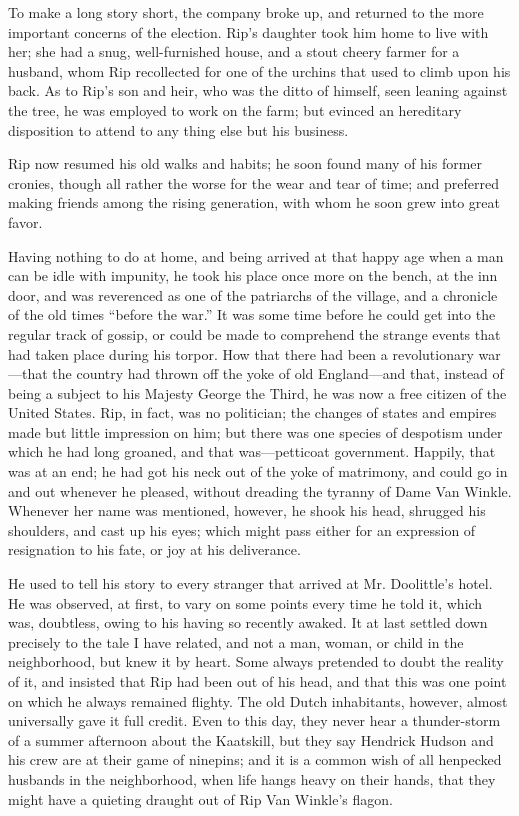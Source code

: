 To make a long story short, the company broke up, and returned to the more important concerns of the election. Rip’s daughter took him home to live with her; she had a snug, well-furnished house, and a stout cheery farmer for a husband, whom Rip recollected for one of the urchins that used to climb upon his back. As to Rip’s son and heir, who was the ditto of himself, seen leaning against the tree, he was employed to work on the farm; but evinced an hereditary disposition to attend to any thing else but his business.

Rip now resumed his old walks and habits; he soon found many of his former cronies, though all rather the worse for the wear and tear of time; and preferred making friends among the rising generation, with whom he soon grew into great favor.

Having nothing to do at home, and being arrived at that happy age when a man can be idle with impunity, he took his place once more on the bench, at the inn door, and was reverenced as one of the patriarchs of the village, and a chronicle of the old times “before the war.” It was some time before he could get into the regular track of gossip, or could be made to comprehend the strange events that had taken place during his torpor. How that there had been a revolutionary war—that the country had thrown off the yoke of old England—and that, instead of being a subject to his Majesty George the Third, he was now a free citizen of the United States. Rip, in fact, was no politician; the changes of states and empires made but little impression on him; but there was one species of despotism under which he had long groaned, and that was—petticoat government. Happily, that was at an end; he had got his neck out of the yoke of matrimony, and could go in and out whenever he pleased, without dreading the tyranny of Dame Van Winkle. Whenever her name was mentioned, however, he shook his head, shrugged his shoulders, and cast up his eyes; which might pass either for an expression of resignation to his fate, or joy at his deliverance.

He used to tell his story to every stranger that arrived at Mr. Doolittle’s hotel. He was observed, at first, to vary on some points every time he told it, which was, doubtless, owing to his having so recently awaked. It at last settled down precisely to the tale I have related, and not a man, woman, or child in the neighborhood, but knew it by heart. Some always pretended to doubt the reality of it, and insisted that Rip had been out of his head, and that this was one point on which he always remained flighty. The old Dutch inhabitants, however, almost universally gave it full credit. Even to this day, they never hear a thunder-storm of a summer afternoon about the Kaatskill, but they say Hendrick Hudson and his crew are at their game of ninepins; and it is a common wish of all henpecked husbands in the neighborhood, when life hangs heavy on their hands, that they might have a quieting draught out of Rip Van Winkle’s flagon.

